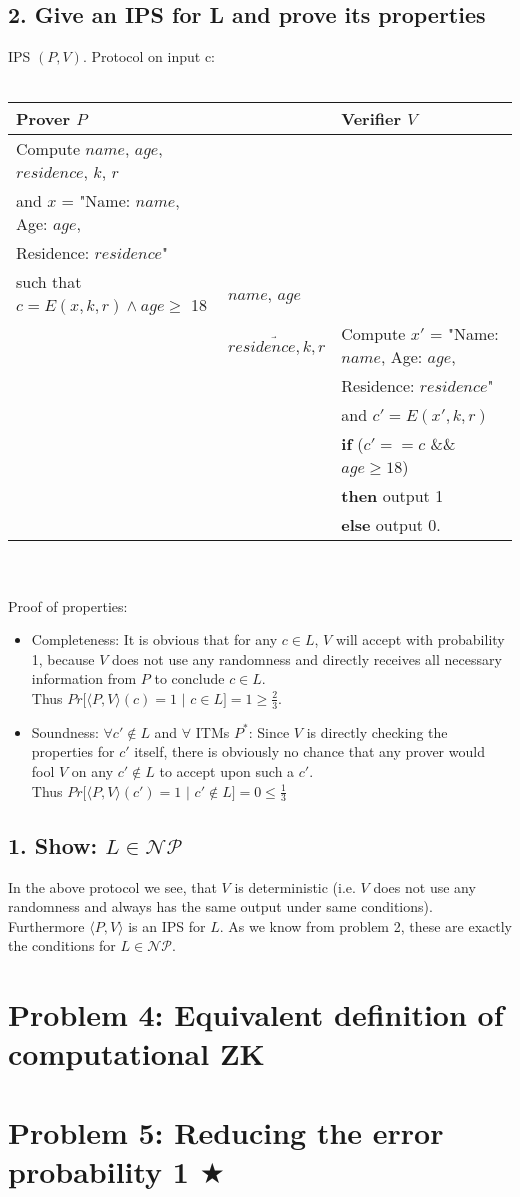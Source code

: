\documentclass[12pt,pdftex,a4paper]{article}
\begin{document}
\subsection*{2. Give an IPS for L and prove its properties}
IPS $(P, V)$. Protocol on input c:
\\~\\
\footnotesize
\begin{tabular}{lll}
Prover $P$ && Verifier $V$\\
\hline
Compute $name$, $age$, $residence$, $k$, $r$ 
\\and $x$ = "Name: $name$, Age: $age$, \\
Residence: $residence$"\\
such that $c = E(x, k, r) \land age \geq$ 18 & $name$, $age$\\
&$\underrightarrow{residence, k, r}$ & Compute $x'$ = "Name: $name$, Age: $age$, \\
&& Residence: $residence$"\\
&& and $c' = E(x', k, r)$\\
&& \textbf{if} ($c' == c$ \&\& $age \geq 18$)\\
&& \textbf{then} output 1\\
&& \textbf{else} output 0.\\
\end{tabular}\\~\\
\normalsize
Proof of properties:
\begin{itemize}
\item Completeness: It is obvious that for any $c \in L$, $V$ will accept with probability 1, because $V$ does not use any randomness and directly receives all necessary information from $P$ to conclude $c\in L$.\\Thus $Pr[\langle P, V\rangle (c)=1$ $|$ $c\in L] = 1 \geq \frac{2}{3}$.
\item Soundness: $\forall c'\notin L$ and $\forall$ ITMs $P^*$: Since $V$ is directly checking the properties for $c'$ itself, there is obviously no chance that any prover would fool $V$ on any $c'\notin L$ to accept upon such a $c'$.\\Thus $Pr[\langle P, V\rangle (c') = 1$ $|$ $c'\notin L] = 0 \leq \frac{1}{3}$
\end{itemize}

\subsection*{1. Show: $L\in \mathcal{NP}$}
In the above protocol we see, that $V$ is deterministic (i.e. $V$ does not use any randomness and always has the same output under same conditions). Furthermore $\langle P, V \rangle$ is an IPS for $L$. As we know from problem 2, these are exactly the conditions for $L\in \mathcal{NP}$.

\section*{Problem 4: Equivalent definition of computational ZK}


\section*{Problem 5: Reducing the error probability 1 $\bigstar$}
\end{document}
